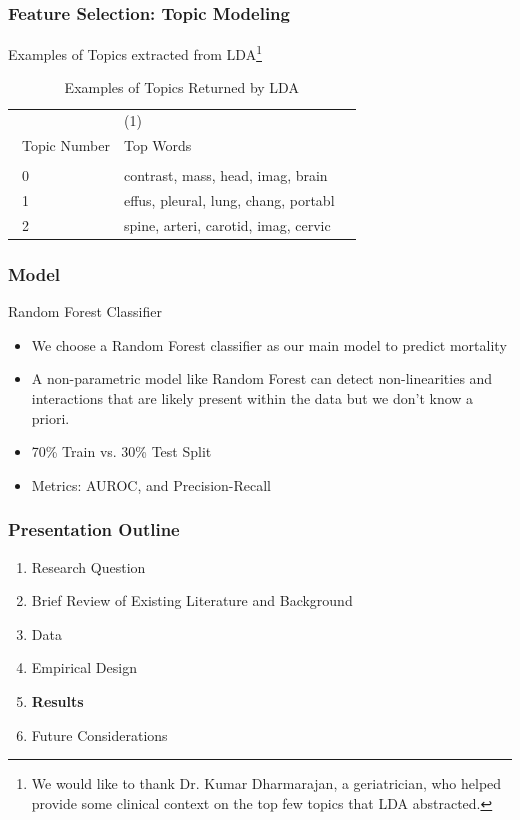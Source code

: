 \documentclass{beamer}
\begin{document}
\begin{frame}
\label{Feature Selection: Topic Modeling}
\frametitle{Feature Selection: Topic Modeling}

Examples of Topics extracted from LDA\footnote{We would like to thank Dr. Kumar Dharmarajan, a geriatrician, who helped provide some clinical context on the top few topics that LDA abstracted.}

\begin{table}[H]
\footnotesize
{}%
\caption{Examples of Topics Returned by LDA}
\label{LDA}
\centering
\begin{tabularx}{\textwidth}{l C C}\hline
 & (1) \\\
Topic Number & Top Words \\ \hline
 &    \\\
0 & contrast, mass, head, imag, brain  \\\
1 & effus, pleural, lung, chang, portabl \\\
2 & spine, arteri, carotid, imag, cervic
\end{tabularx}
\end{table}
\end{frame}

\begin{frame}
\label{Model}
\frametitle{Model}

Random Forest Classifier

\begin{itemize}
\item We choose a Random Forest classifier as our main model to predict mortality
\item A non-parametric model like Random Forest can detect non-linearities and interactions that are likely present within the data but we don't know a priori.
\item 70\% Train vs. 30\% Test Split
\item Metrics: AUROC, and Precision-Recall
\end{itemize}
\end{frame}

\begin{frame}
\label{Presentation Outline 6}
\frametitle{Presentation Outline}
\begin{enumerate}
\item[1.] Research Question
\newline
\item[2.] Brief Review of Existing Literature and Background
\newline
\item[3.] Data
\newline
\item[4.] Empirical Design
\newline
\item[5.] \textbf{Results}
\newline
\item[6.] Future Considerations
\end{enumerate}
\end{frame}
\end{document}
